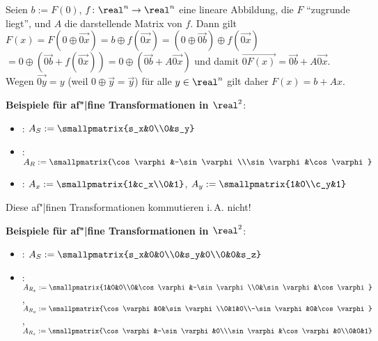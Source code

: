 \begin{Beweis}
    Seien $b := F(0)$, $f\colon \real^n \to \real^n$ eine lineare Abbildung,
    die $F$ "`zugrunde liegt"', und $A$ die darstellende Matrix von $f$.
    Dann gilt
    $F(x)
    = F(0 \oplus \vec{0x})
    = b \oplus f(\vec{0x})
    = (0 \oplus \vec{0b}) \oplus f(\vec{0x})$\\
    $= 0 \oplus (\vec{0b} + f(\vec{0x}))
    = 0 \oplus (\vec{0b} + A\vec{0x})$ und damit
    $\vec{0F(x)} = \vec{0b} + A\vec{0x}$.
    Wegen $\vec{0y} = y$ (weil $0 \oplus \vec{y} = \vec{y}$) für alle $y \in \real^n$ gilt daher
    $F(x) = b + Ax$.
\end{Beweis}

\linie

\textbf{Beispiele für af"|fine Transformationen in $\real^2$}:
\begin{itemize}
    \item
    :
    $A_S := \smallpmatrix{s_x&0\\0&s_y}$

    \item
    :
    $A_R := \smallpmatrix{\cos\varphi&-\sin\varphi\\\sin\varphi&\cos\varphi}$

    \item
    :
    $A_x := \smallpmatrix{1&c_x\\0&1}$,
    $A_y := \smallpmatrix{1&0\\c_y&1}$
\end{itemize}
Diese af"|finen Transformationen kommutieren i.\,A. nicht!

\linie

\textbf{Beispiele für af"|fine Transformationen in $\real^2$}:
\begin{itemize}
    \item
    :
    $A_S := \smallpmatrix{s_x&0&0\\0&s_y&0\\0&0&s_z}$

    \item
    :
    $A_{R_x} := \smallpmatrix{1&0&0\\0&\cos\varphi&-\sin\varphi\\0&\sin\varphi&\cos\varphi}$,
    $A_{R_y} := \smallpmatrix{\cos\varphi&0&\sin\varphi\\0&1&0\\-\sin\varphi&0&\cos\varphi}$,
    $A_{R_z} := \smallpmatrix{\cos\varphi&-\sin\varphi&0\\\sin\varphi&\cos\varphi&0\\0&0&1}$
\end{itemize}

